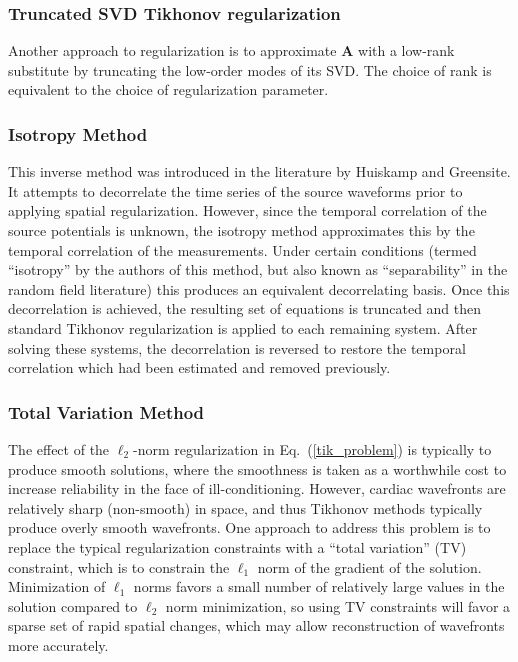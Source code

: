 \subsubsection{Truncated SVD Tikhonov regularization}

Another approach to regularization is to approximate $\mathbf{A}$ with a
low-rank substitute by truncating the low-order modes of its SVD. The
choice of rank is equivalent to the choice of regularization parameter.

\subsubsection{Isotropy Method}

This inverse method was introduced in the literature by Huiskamp and
Greensite.
It attempts to decorrelate the time series of the source waveforms prior to
applying spatial regularization.
However, since the temporal correlation of the source potentials
is unknown, the isotropy method approximates this by the temporal
correlation of the measurements. Under certain conditions (termed ``isotropy'' by the
authors of this method, but also known as ``separability'' in
the random field literature)
this produces an equivalent decorrelating basis. Once this decorrelation is
achieved, the resulting set of equations is truncated and then standard
Tikhonov regularization is applied to each remaining system. After solving
these systems, the decorrelation is reversed to restore the
temporal correlation which had been estimated and removed previously.

\subsubsection{Total Variation Method} \label{sec:inv-tv}

The effect of the $\ell_{2}$-norm regularization in Eq.~(\ref{tik_problem}) is
typically to produce smooth solutions, where the smoothness is taken as a
worthwhile cost to increase reliability in the face of
ill-conditioning. However, cardiac wavefronts are relatively sharp
(non-smooth) in space, and thus Tikhonov methods typically produce overly
smooth wavefronts. One approach to address this problem is to replace the
typical regularization constraints with a ``total variation'' (TV) constraint,
which is to constrain the $\ell_{1}$ norm of the gradient of the
solution. Minimization of $\ell_{1}$ norms favors a small number of
relatively large values in the solution compared to $\ell_{2}$ norm
minimization, so using TV constraints will favor a sparse set of
rapid spatial changes, which may allow reconstruction of wavefronts more
accurately.

